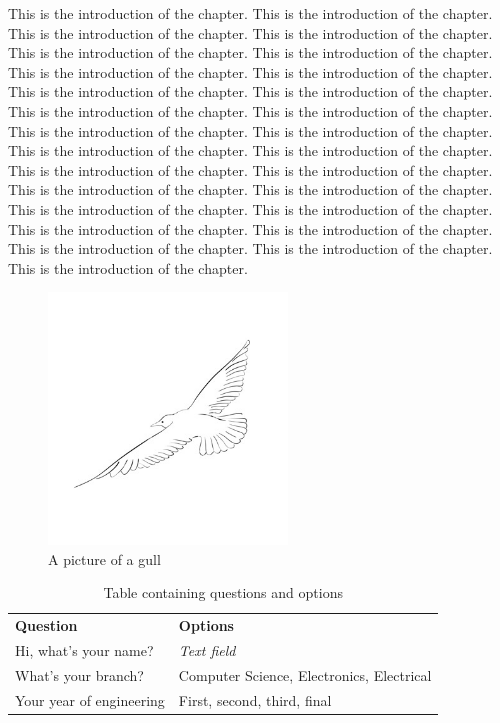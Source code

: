 \documentclass{nithreport}
\begin{document}
This is the introduction of the chapter. This is the introduction of the chapter. This is the introduction of the chapter. This is the introduction of the chapter. This is the introduction of the chapter. This is the introduction of the chapter. This is the introduction of the chapter.\cite{big} This is the introduction of the chapter. This is the introduction of the chapter. This is the introduction of the chapter. This is the introduction of the chapter. This is the introduction of the chapter. This is the introduction of the chapter. This is the introduction of the chapter. This is the introduction of the chapter. This is the introduction of the chapter. This is the introduction of the chapter. This is the introduction of the chapter. This is the introduction of the chapter. This is the introduction of the chapter. This is the introduction of the chapter. This is the introduction of the chapter. This is the introduction of the chapter. This is the introduction of the chapter. This is the introduction of the chapter. This is the introduction of the chapter. This is the introduction of the chapter.

\begin{figure}
  \centering %
  \includegraphics[width=2.5in, keepaspectratio]{gull.jpg}
  \caption{A picture of a gull}
\end{figure}

\begin{table}[h!]
\begin{tabular}{ | p{4in} | p{2in}| } 
 \hline
 {\bf Question} & {\bf Options} \\ 
 Hi, what's your name? & {\it Text field} \\ 
 What's your branch? & Computer Science, Electronics, Electrical \\
 Your year of engineering & First, second, third, final \\
 \hline
\end{tabular}
\caption{Table containing questions and options}
\end{table}
\end{document}

